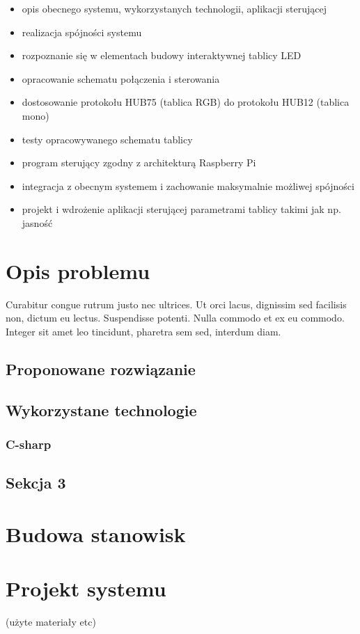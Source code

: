 \documentclass[wmii,inf,mgr]{uwmthesis}
\begin{document}
\begin{itemize}
	\item opis obecnego systemu, wykorzystanych technologii, aplikacji sterującej
	\item realizacja spójności systemu
	\item rozpoznanie się w elementach budowy interaktywnej tablicy LED
	\item opracowanie schematu połączenia i sterowania
	\item dostosowanie protokołu HUB75 (tablica RGB) do protokołu HUB12 (tablica mono)
	\item testy opracowywanego schematu tablicy
	\item program sterujący zgodny z architekturą Raspberry Pi
	\item integracja z obecnym systemem i zachowanie maksymalnie możliwej spójności
	\item projekt i wdrożenie aplikacji sterującej parametrami tablicy takimi jak np. jasność
\end{itemize}




\chapter{Opis problemu}
Curabitur congue rutrum justo nec ultrices. Ut orci lacus, dignissim sed facilisis non, dictum eu lectus. Suspendisse potenti. Nulla commodo et ex eu commodo. Integer sit amet leo tincidunt, pharetra sem sed, interdum diam.
\section{Proponowane rozwiązanie}
\section{Wykorzystane technologie}
\subsection{C-sharp}
\section{Sekcja 3}

\chapter{Budowa stanowisk}
\chapter{Projekt systemu}
(użyte materiały etc)
\end{document}

